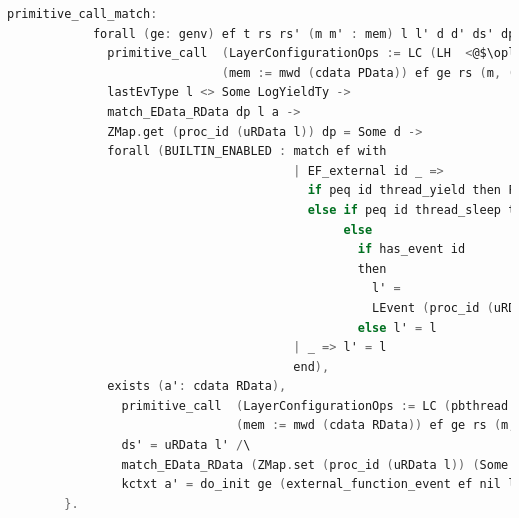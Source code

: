 \begin{lstlisting}[language=C]     
          primitive_call_match:
            forall (ge: genv) ef t rs rs' (m m' : mem) l l' d d' ds' dp (a: cdata RData),
              primitive_call  (LayerConfigurationOps := LC (LH  <@$\oplus$@>  L64))  
                              (mem := mwd (cdata PData)) ef ge rs (m, (uRData l, d)) t rs' (m', (ds', d')) ->
              lastEvType l <> Some LogYieldTy ->
              match_EData_RData dp l a ->
              ZMap.get (proc_id (uRData l)) dp = Some d ->
              forall (BUILTIN_ENABLED : match ef with
                                        | EF_external id _ => 
                                          if peq id thread_yield then False
                                          else if peq id thread_sleep then False
                                               else
                                                 if has_event id
                                                 then
                                                   l' =
                                                   LEvent (proc_id (uRData l)) (LogPrim id nil 0 (snap_func d)) :: l
                                                 else l' = l
                                        | _ => l' = l
                                        end),
              exists (a': cdata RData),
                primitive_call  (LayerConfigurationOps := LC (pbthread  <@$\oplus$@>  L64)) 
                                (mem := mwd (cdata RData)) ef ge rs (m, a) t rs' (m', a') /\
                ds' = uRData l' /\
                match_EData_RData (ZMap.set (proc_id (uRData l)) (Some d') dp) l' a' /\
                kctxt a' = do_init ge (external_function_event ef nil l 0 (snap_func d)) l (kctxt a)
        }.
\end{lstlisting}


